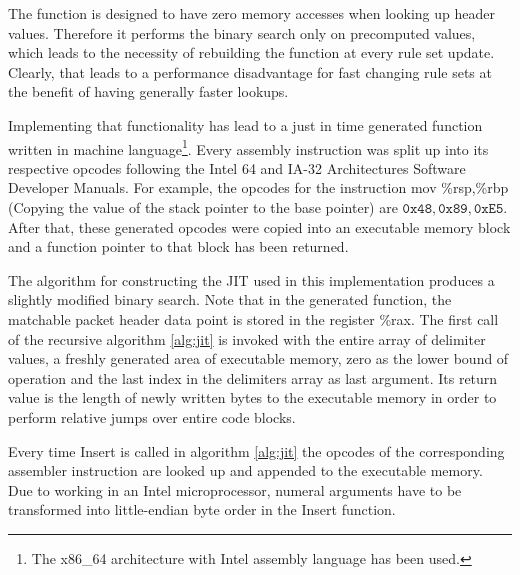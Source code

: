 \documentclass[a4paper,
		12pt,
		parskip=full,
		titlepage
		]{scrartcl}
\begin{document}
The function is designed to have zero memory accesses when looking up header values.
Therefore it performs the binary search only on precomputed values, which 
leads to the necessity of rebuilding the function at every rule set update.
Clearly, that leads to a performance disadvantage for fast changing rule sets at the benefit of having generally faster lookups.

Implementing that functionality has lead to a just in time generated function written in machine 
language\footnote{The x86\_64 architecture with Intel assembly language has been used.}.
Every assembly instruction was split up into its respective opcodes following the 
Intel 64 and IA-32 Architectures Software Developer Manuals.
For example, the opcodes for the instruction 
\textsf{mov \%rsp,\%rbp} (Copying the value of the stack pointer to the base pointer) 
are $\texttt{0x48}, \texttt{0x89}, \texttt{0xE5}$.
After that, these generated opcodes were copied into an executable memory block and a function pointer to that block has been returned.

The algorithm for constructing the JIT used in this implementation produces a slightly modified binary search.
Note that in the generated function, the matchable packet header data point is stored in the register \textsf{\%rax}.
The first call of the recursive algorithm \ref{alg:jit} is invoked with the entire array of delimiter values, a freshly generated area of executable memory, 
zero as the lower bound of operation and the last index in the delimiters array as last argument.
Its return value is the length of newly written bytes to the executable memory in order to perform relative jumps over entire code blocks.

Every time \textsf{Insert} is called in algorithm \ref{alg:jit} the opcodes 
of the corresponding assembler instruction are looked up and appended to the executable memory.
Due to working in an Intel microprocessor, numeral arguments have to be 
transformed into little-endian byte order in the \textsf{Insert} function.
\end{document}
